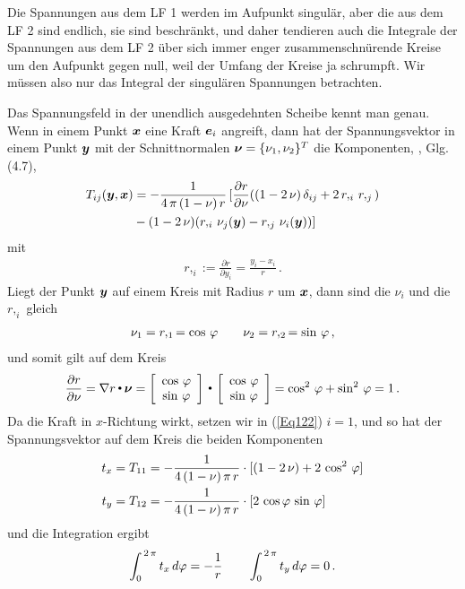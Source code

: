 Die Spannungen aus dem LF 1 werden im Aufpunkt singul\"{a}r, aber die aus dem LF 2 sind endlich, sie sind beschr\"{a}nkt, und daher tendieren auch die Integrale der Spannungen aus dem LF 2 \"{u}ber sich immer enger zusammenschn\"{u}rende Kreise um den Aufpunkt gegen null, weil der Umfang der Kreise ja schrumpft. Wir m\"{u}ssen also nur das Integral der singul\"{a}ren Spannungen betrachten.

Das Spannungsfeld in der unendlich ausgedehnten Scheibe kennt man genau. Wenn in einem Punkt $\vek x$ eine Kraft $\vek e_i$ angreift, dann hat der Spannungsvektor in einem Punkt $\vek y$ mit der Schnittnormalen $\vek \nu = \{\nu_1, \nu_2\}^T$ die Komponenten, \cite{Ha3}, Glg. (4.7),
\begin{align}\label{Eq122}
T_{ij}(\vek y,\vek x) &= - \frac{1}{4\,\pi\,(1-\nu)\,r}\,[\frac{\partial r}{\partial \nu}(( 1- 2\,\nu)\,\delta_{ij} + 2\,r,_i\,r,_j) \nn\\
&- (1- 2\,\nu) (r,_i \,\nu_j(\vek y) - r,_j\,\nu_i(\vek y))]
\end{align}
mit
\begin{align}
r,_i := \frac{\partial r}{\partial y_i} =  \frac{y_i - x_i}{r}\,.
\end{align}
Liegt der Punkt $\vek y$ auf einem Kreis mit Radius $r$ um $\vek x$, dann sind die $\nu_i$ und die $r,_i$ gleich
\begin{align}
\nu_1 = r,_1 = \cos\,\Np \qquad \nu_2 = r,_2 = \sin\,\Np\,,
\end{align}
und somit gilt auf dem Kreis
\begin{align}
\frac{\partial r}{\partial \nu} = \nabla r \dotprod \vek \nu = \left [\barr{c}  \cos\,\Np \\  \sin\,\Np\earr \right ] \dotprod  \left [\barr{c}  \cos\,\Np \\  \sin\,\Np\earr \right ] = \cos^2\,\Np + \sin^2\,\Np = 1\,.
\end{align}
Da die Kraft in $x$-Richtung wirkt, setzen wir in (\ref{Eq122}) $i = 1$, und  so hat der Spannungsvektor auf dem Kreis die beiden Komponenten
\begin{align}
t_x &= T_{11} = - \frac{1}{4\,(1-\nu)\, \pi\,r} \cdot [(1- 2\,\nu) + 2\,\cos^2\,\Np] \\
t_y &= T_{12} = - \frac{1}{4\,(1-\nu)\,\pi\,r} \cdot [2\,\cos \Np \,\sin\,\Np]
\end{align}
und die Integration ergibt
\begin{align}
\int_0^{\,2\,\pi} t_x\,d\Np = -\frac{1}{r} \qquad \int_0^{\,2\,\pi} t_y\,d\Np = 0\,.
\end{align}
